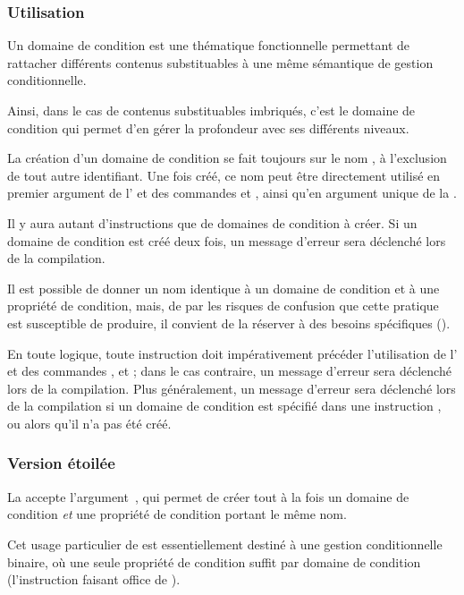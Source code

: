 \documentclass{article}
\begin{document}
\subsubsection{Utilisation}
Un domaine de condition est une thématique fonctionnelle permettant de rattacher différents contenus substituables à une même sémantique de gestion conditionnelle.

Ainsi, dans le cas de contenus substituables imbriqués, c'est le domaine de condition qui permet d'en gérer la profondeur avec ses différents niveaux.

La création d'un domaine de condition se fait toujours sur le nom , à l'exclusion de tout autre identifiant. Une fois créé, ce nom peut être directement utilisé en premier argument de l' et des commandes  et , ainsi qu'en argument unique de la .

Il y aura autant d'instructions  que de domaines de condition à créer. Si un domaine de condition est créé deux fois, un message d'erreur sera déclenché lors de la compilation.

Il est possible de donner un nom identique à un domaine de condition et à une propriété de condition, mais, de par les risques de confusion que cette pratique est susceptible de produire, il convient de la réserver à des besoins spécifiques ().

En toute logique, toute instruction  doit impérativement précéder l'utilisation de l' et des commandes ,  et  ; dans le cas contraire, un message d'erreur sera déclenché lors de la compilation. Plus généralement, un message d'erreur sera déclenché lors de la compilation si un domaine de condition est spécifié dans une instruction ,  ou  alors qu'il n'a pas été créé.

\subsubsection{Version étoilée}\label{CtDoc_Commandes_NewCondiField_Etoile}
La  accepte l'argument~\val{*}, qui permet de créer tout à la fois un domaine de condition \emph{et} une propriété de condition portant le même nom.

Cet usage particulier de  est essentiellement destiné à une gestion conditionnelle binaire, où une seule propriété de condition suffit par domaine de condition (l'instruction  faisant office de ).
\end{document}
